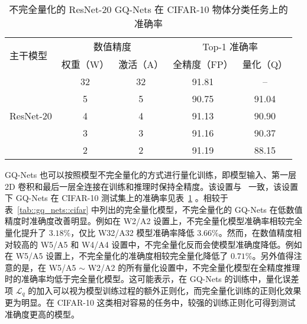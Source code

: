 \begin{table}[htb]
  \centering
  \caption{不完全量化的 ResNet-20 GQ-Nets 在 CIFAR-10 物体分类任务上的准确率}
  \label{tab::gq_nets::cifar_fpfl}
  \begin{tabular}{l *{4}{c}}
    \toprule
    \multirow{2}{*}{主干模型} & \multicolumn{2}{c}{数值精度} &\multicolumn{2}{c}{Top-1 准确率} \\
    & 权重（W） & 激活（A） & 全精度（FP） & 量化（Q） \\
    \midrule
    \multirow{5}{*}{ResNet-20} & 32 & 32 & 91.81 & -- \\
    & 5 & 5 & 90.75 & 91.04 \\
    & 4 & 4 & 91.13 & 90.90 \\
    & 3 & 3 & 91.16 & 90.37 \\
    & 2 & 2 & 91.19 & 88.15 \\
    \bottomrule
  \end{tabular}
\end{table}

GQ-Nets 也可以按照模型不完全量化的方式进行量化训练，即模型输入、第一层 2D 卷积和最后一层全连接在训练和推理时保持全精度。该设置与~\citet{zhou2016dorefanet, choi2018pact, Zhang_2018, li2019additive} 一致，该设置下 GQ-Nets 在 CIFAR-10 测试集上的准确率见表~\ref{tab::gq_nets::cifar_fpfl} 。相较于表~\ref{tab::gq_nets::cifar} 中列出的完全量化模型，不完全量化的 GQ-Nets 在低数值精度时准确度改善明显。例如在 W2/A2 设置上，不完全量化模型准确率相较完全量化提升了 $3.18\%$，仅比 W32/A32 模型准确率降低 $3.66\%$。然而，在数值精度相对较高的 W5/A5 和 W4/A4 设置中，不完全量化反而会使模型准确度降低。例如在 W5/A5 设置上，不完全量化的准确度相较完全量化降低了 $0.71\%$。另外值得注意的是，在 W5/A5 $\sim$ W2/A2 的所有量化设置中，不完全量化模型在全精度推理时的准确率均低于完全量化模型。这可能表示，在 GQ-Nets 的训练中，量化误差项 $\mathcal{L}_q$ 的加入可以视为模型训练过程的额外正则化，而完全量化训练的正则化效果更为明显。在 CIFAR-10 这类相对容易的任务中，较强的训练正则化可得到测试准确度更高的模型。


